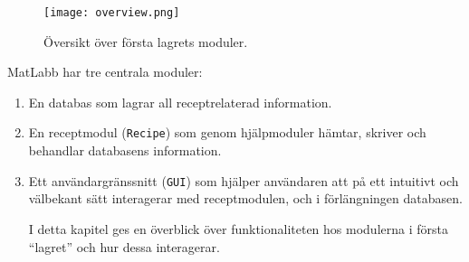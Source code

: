 
\begin{figure}[h]
\centering
\texttt{[image: overview.png]}
\caption{Översikt över första lagrets moduler.}
\label{fig:overview}
\end{figure}

MatLabb har tre centrala moduler: 
\begin{enumerate}
\item En databas som lagrar all receptrelaterad information.
\item En receptmodul (\verb=Recipe=) som genom hjälpmoduler hämtar, skriver och behandlar databasens information.
\item Ett användargränssnitt (\verb=GUI=) som hjälper användaren att på ett intuitivt och välbekant sätt interagerar med receptmodulen, och i förlängningen databasen.

I detta kapitel ges en överblick över funktionaliteten hos modulerna i första ``lagret'' och hur dessa interagerar.
\end{enumerate}
